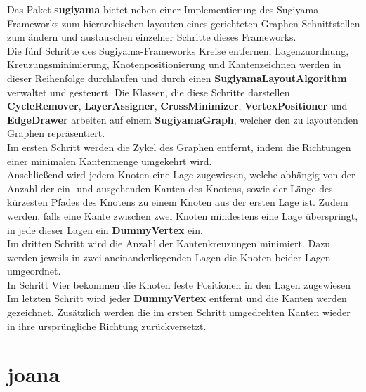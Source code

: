 Das Paket \textbf{sugiyama} bietet neben einer Implementierung des Sugiyama-Frameworks zum hierarchischen layouten eines gerichteten Graphen Schnittstellen zum ändern und austauschen einzelner Schritte dieses Frameworks.\\
Die fünf Schritte des Sugiyama-Frameworks Kreise entfernen, Lagenzuordnung, Kreuzungsminimierung, Knotenpositionierung und Kantenzeichnen werden in dieser Reihenfolge durchlaufen und durch einen \textbf{SugiyamaLayoutAlgorithm} verwaltet und gesteuert. Die Klassen, die diese Schritte darstellen \textbf{CycleRemover}, \textbf{LayerAssigner}, \textbf{CrossMinimizer}, \textbf{VertexPositioner} und \textbf{EdgeDrawer} arbeiten auf einem \textbf{SugiyamaGraph}, welcher den zu layoutenden Graphen repräsentiert.\\
Im ersten Schritt werden die Zykel des Graphen entfernt, indem die Richtungen einer minimalen Kantenmenge umgekehrt wird.\\
Anschließend wird jedem Knoten eine Lage zugewiesen, welche abhängig von der Anzahl der ein- und ausgehenden Kanten des Knotens, sowie der Länge des kürzesten Pfades des Knotens zu einem Knoten aus der ersten Lage ist. Zudem werden, falls eine Kante zwischen zwei Knoten mindestens eine Lage überspringt, in jede dieser Lagen ein \textbf{DummyVertex} ein.\\
Im dritten Schritt wird die Anzahl der Kantenkreuzungen minimiert. Dazu werden jeweils in zwei aneinanderliegenden Lagen die Knoten beider Lagen umgeordnet.\\
In Schritt Vier bekommen die Knoten feste Positionen in den Lagen zugewiesen\\
Im letzten Schritt wird jeder \textbf{DummyVertex} entfernt und die Kanten werden gezeichnet. Zusätzlich werden die im ersten Schritt umgedrehten Kanten wieder in ihre ursprüngliche Richtung zurückversetzt.

\newpage

\section{joana}

